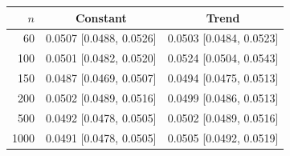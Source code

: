 \begin{tabular}{rcc}
\toprule
$n$ & Constant & Trend \\
\midrule
60 & 0.0507 [0.0488, 0.0526] & 0.0503 [0.0484, 0.0523] \\
100 & 0.0501 [0.0482, 0.0520] & 0.0524 [0.0504, 0.0543] \\
150 & 0.0487 [0.0469, 0.0507] & 0.0494 [0.0475, 0.0513] \\
200 & 0.0502 [0.0489, 0.0516] & 0.0499 [0.0486, 0.0513] \\
500 & 0.0492 [0.0478, 0.0505] & 0.0502 [0.0489, 0.0516] \\
1000 & 0.0491 [0.0478, 0.0505] & 0.0505 [0.0492, 0.0519] \\
\bottomrule
\end{tabular}
